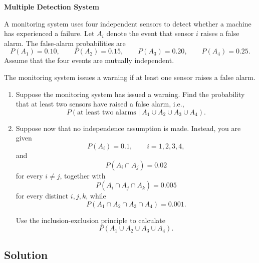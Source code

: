 \documentclass[12pt]{article}
\begin{document}
\textbf{Multiple Detection System}

A monitoring system uses four independent sensors to detect whether a machine has experienced a failure.
Let $A_i$ denote the event that sensor $i$ raises a false alarm.
The false-alarm probabilities are
\[
P(A_1)=0.10,\qquad
P(A_2)=0.15,\qquad
P(A_3)=0.20,\qquad
P(A_4)=0.25.
\]
Assume that the four events are mutually independent.

The monitoring system issues a warning if at least one sensor raises a false alarm.

\begin{enumerate}
    \item[(a)] Suppose the monitoring system has issued a warning.
    Find the probability that at least two sensors have raised a false alarm, i.e.,
    \[
    P(\text{at least two alarms}\mid A_1\cup A_2\cup A_3\cup A_4).
    \]

    \item[(b)] Suppose now that no independence assumption is made.
    Instead, you are given
    \[
    P(A_i)=0.1,\qquad i=1,2,3,4,
    \]
    and
    \[
    P(A_i\cap A_j)=0.02
    \]
    for every $i\neq j$, together with
    \[
    P(A_i\cap A_j\cap A_k)=0.005
    \]
    for every distinct $i,j,k$, while
    \[
    P(A_1\cap A_2\cap A_3\cap A_4)=0.001.
    \]

    Use the inclusion-exclusion principle to calculate
    \[
    P(A_1\cup A_2\cup A_3\cup A_4).
    \]
\end{enumerate}

\subsection*{Solution}
\end{document}
